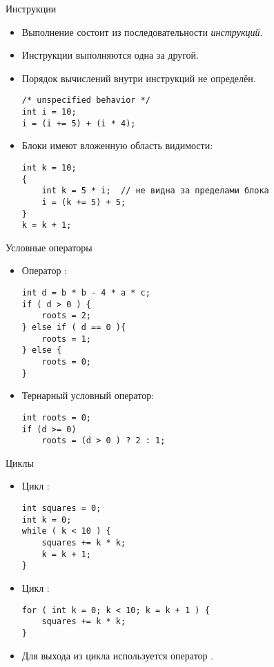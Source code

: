 \documentclass{beamer}
\begin{document}
\begin{frame}[fragile]{Инструкции}
    \begin{itemize}
        \item Выполнение состоит из последовательности {\em инструкций}.

        \item Инструкции выполняются одна за другой.

        \item Порядок вычислений внутри инструкций не определён.
            \begin{lstlisting}
/* unspecified behavior */
int i = 10;
i = (i += 5) + (i * 4); 
            \end{lstlisting}
        \item Блоки имеют вложенную область видимости:
            \begin{lstlisting}
int k = 10;                
{   
    int k = 5 * i;  // не видна за пределами блока
    i = (k += 5) + 5; 
}
k = k + 1;
            \end{lstlisting}

    \end{itemize}
\end{frame}

\begin{frame}[fragile]{Условные операторы}
\begin{itemize}    
    \item Оператор :
    \begin{lstlisting}
int d = b * b - 4 * a * c;
if ( d > 0 ) {
    roots = 2;
} else if ( d == 0 ){  
    roots = 1;
} else {
    roots = 0;
}
    \end{lstlisting}

    \item Тернарный условный оператор:
    \begin{lstlisting}
int roots = 0;
if (d >= 0)
    roots = (d > 0 ) ? 2 : 1;
    \end{lstlisting}
\end{itemize}
\end{frame}

\begin{frame}[fragile]{Циклы}
\begin{itemize}    
    \item Цикл :
    \begin{lstlisting}
int squares = 0;
int k = 0; 
while ( k < 10 ) {
    squares += k * k;
    k = k + 1;
} 
    \end{lstlisting}

    \item Цикл :
    \begin{lstlisting}
for ( int k = 0; k < 10; k = k + 1 ) {
    squares += k * k;
} 
    \end{lstlisting}
\item Для выхода из цикла используется оператор .
\end{itemize}
\end{frame}
\end{document}
